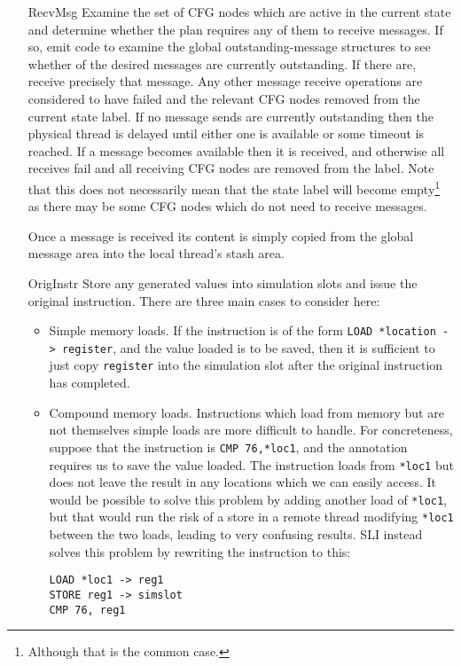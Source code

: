 \begin{itemize}
\item[RecvMsg]
  Examine the set of CFG nodes which are active in the current state and determine whether the plan requires any of them to receive messages.
  If so, emit code to examine the global outstanding-message structures to see whether of the desired messages are currently outstanding.
  If there are, receive precisely that message.
  Any other message receive operations are considered to have failed and the relevant CFG nodes removed from the current state label.
  If no message sends are currently outstanding then the physical thread is delayed until either one is available or some timeout is reached.
  If a message becomes available then it is received, and otherwise all receives fail and all receiving CFG nodes are removed from the label.
  Note that this does not necessarily mean that the state label will become empty\footnote{Although that is the common case.} as there may be some CFG nodes which do not need to receive messages.

  Once a message is received its content is simply copied from the global message area into the local thread's stash area.
\item[OrigInstr]
  Store any generated values into simulation slots and issue the original instruction.
  There are three main cases to consider here:

  \begin{itemize}
  \item
    Simple memory loads.
    If the instruction is of the form \verb|LOAD *location -> register|, and the value loaded is to be saved, then it is sufficient to just copy \verb|register| into the simulation slot after the original instruction has completed.
  \item
    Compound memory loads.
    Instructions which load from memory but are not themselves simple loads are more difficult to handle.
    For concreteness, suppose that the instruction is \verb|CMP 76,*loc1|, and the annotation requires us to save the value loaded.
    The instruction loads from \verb|*loc1| but does not leave the result in any locations which we can easily access.
    It would be possible to solve this problem by adding another load of \verb|*loc1|, but that would run the risk of a store in a remote thread modifying \verb|*loc1| between the two loads, leading to very confusing results.
    SLI instead solves this problem by rewriting the instruction to this:

\begin{verbatim}
LOAD *loc1 -> reg1
STORE reg1 -> simslot
CMP 76, reg1
\end{verbatim}


\end{itemize}
\end{itemize}
